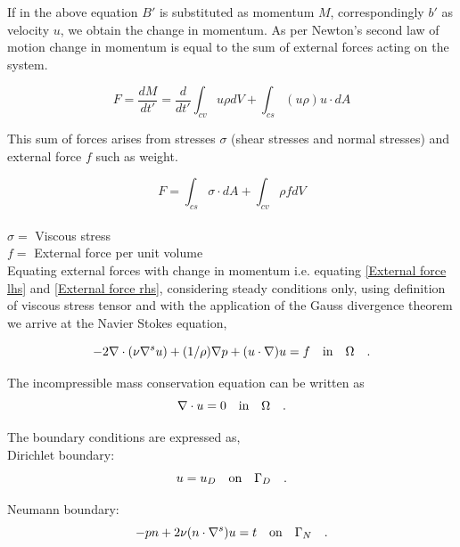 \documentclass[a4paper]{book}
\begin{document}
If in the above equation $B'$ is substituted as momentum $M$, correspondingly $b'$ as velocity $u$, we obtain the change in momentum. As per Newton's second law of motion change in momentum is equal to the sum of external forces acting on the system. 

\begin{equation}\label{External force lhs}
F = \frac{dM}{dt'} = \frac{d}{dt'} \int_{cv} u \rho dV + \int_{cs} (u \rho) u\cdot dA 
\end{equation}

This sum of forces arises from stresses $\sigma$ (shear stresses and normal stresses) and external force $f$ such as weight. 

\begin{equation}\label{External force rhs}
F = \int_{cs} \sigma \cdot dA + \int_{cv} \rho f dV
\end{equation}
\\
$\sigma =$ Viscous stress\\
$f =$ External force per unit volume\\

Equating external forces with change in momentum i.e. equating \eqref{External force lhs} and \eqref{External force rhs}, considering steady conditions only, using definition of viscous stress tensor and with the application of the Gauss divergence theorem we arrive at the Navier Stokes equation,

\begin{equation} \label{navier_stokes}
-2\nabla \cdot (\nu \nabla^s u) + (1/\rho) \nabla p + (u \cdot \nabla)u = f \quad   \textnormal{in}  \quad \Omega \quad \textrm{.}
\end{equation} 

The incompressible mass conservation equation can be written as
\begin{equation}\label{mass_conservation}
\nabla \cdot u=0 \quad   \textnormal{in}  \quad \Omega \quad \textrm{.}
\end{equation}

The boundary conditions are expressed as,\\

Dirichlet boundary:
\begin{equation}\label{dirichlet_ns}
u=u_D \quad \textnormal{on} \quad \Gamma_D \quad \textrm{.}
\end{equation}

Neumann boundary:
\begin{equation} \label{neumann_ns}
-pn + 2\nu(n \cdot \nabla^s)u = t \quad   \textnormal{on}  \quad \Gamma_N \quad \textrm{.}
\end{equation}
\end{document}
